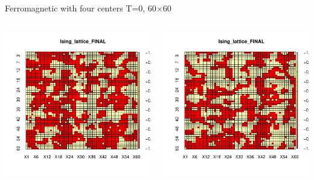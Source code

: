 \documentclass{beamer}
\begin{document}
\begin{frame}{Ferromagnetic with four centers T=0,  60$\times$60}
\begin{columns}
\begin{column}{0.5\textwidth}
    \begin{center}
     \includegraphics[width=\textwidth]{Pic/J+1_60_10000_four_center_T=0_FINAL.pdf}
     \end{center}
\end{column}
\begin{column}{0.5\textwidth}
    \begin{center}
     \includegraphics[width=\textwidth]{Pic/J+1_60_10000_four_center_T=0_2_FINAL.pdf}
     \end{center}
\end{column}
\end{columns}
\end{frame}
\end{document}
